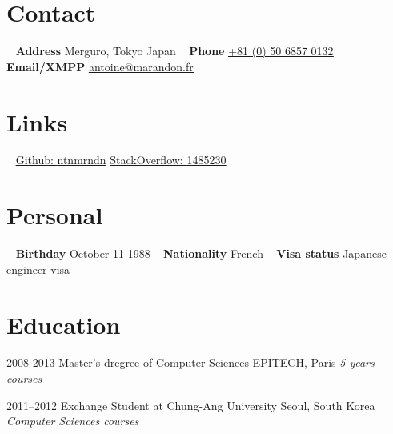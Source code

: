 \documentclass[]{template/friggeri-cv} %
\begin{document}


\begin{aside} %
\section{Contact}
~
\textbf{Address}
Merguro, Tokyo
Japan
~
\textbf{Phone}
\href{tel:00815068670132}{\underline{+81 (0) 50 6857 0132}}
~
\textbf{Email/XMPP}
\href{mailto:antoine@marandon.fr}{\underline{antoine@marandon.fr}}
\section {Links}
~
\href{https://github.com/ntnmrndn}{Github: \underline{ntnmrndn}}
\href{http://stackoverflow.com/users/1485230/}{StackOverflow: \underline{1485230}}
\section{Personal}
~
\textbf{Birthday}
October 11 1988
~
\textbf{Nationality}
French
~
\textbf{Visa status}
Japanese engineer visa
\end{aside}


\section{Education}

\begin{entrylist}


\entry
{2008-2013}
{Master's dregree {\normalfont of Computer Sciences}}
{EPITECH, Paris}
{\emph{5 years courses}}


\entry
{2011--2012}
{Exchange Student {\normalfont at Chung-Ang University}}
{Seoul, South Korea}
{\emph{Computer Sciences courses}}


\end{entrylist}
\end{document}
